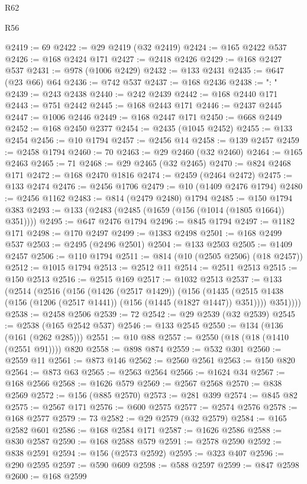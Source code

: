 \begin{lexlean}{R62}
\begin{lexlean}{R56}
\begin{coremodule}
{{{{{{{{{{{{{{{{{{{{{{{{{{{{{{{{{{{{{{{{{{{{{{{{{{{{{{{{{{{{{{{{{{{{{{{{{{{{{{{{{{{{{{{{{{{{{{{{{{{{{{{{{{{{{{{{{{{{{{{{{{{{{{{{{{{{{{{{{{{{{{{{{{{{{{{{{{{{{{{{{{{{{{{{{{{{{{{{{{{{{{{{{{{{{{{{{{{{{{{{{{{{{{{{{{{@2419 := 69
@2422 := @29 @2419 (@32 @2419)
@2424 := @165 @2422 @537
@2426 := @168 @2424 @171
@2427 := @2418 @2426
@2429 := @168 @2427 @537
@2431 := @978 (@1006 @2429)
@2432 := @133 @2431
@2435 := @647 (@23 @66) @64
@2436 := @742 @537
@2437 := @168 @2436
@2438 := ": "
@2439 := @243 @2438
@2440 := @242 @2439
@2442 := @168 @2440 @171
@2443 := @751 @2442
@2445 := @168 @2443 @171
@2446 := @2437 @2445
@2447 := @1006 @2446
@2449 := @168 @2447 @171
@2450 := @668 @2449
@2452 := @168 @2450 @2377
@2454 := @2435 (@1045 @2452)
@2455 := @133 @2454
@2456 := @10 @1794
@2457 := @2456 @14
@2458 := @139 @2457
@2459 := @2458 @1794
@2460 := 70
@2463 := @29 @2460 (@32 @2460)
@2464 := @165 @2463
@2465 := 71
@2468 := @29 @2465 (@32 @2465)
@2470 := @824 @2468 @171
@2472 := @168 @2470 @1816
@2474 := @2459 (@2464 @2472)
@2475 := @133 @2474
@2476 := @2456 @1706
@2479 := @10 (@1409 @2476 @1794)
@2480 := @2456 @1162
@2483 := @814 (@2479 @2480) @1794
@2485 := @150 @1794 @383
@2493 := @133 (@2483 (@2485 (@1659 (@156 (@1014 (@1805 @1664)) @351))))
@2495 := @647 @2476 @1794
@2496 := @845 @1794
@2497 := @1182 @171
@2498 := @170 @2497
@2499 := @1383 @2498
@2501 := @168 @2499 @537
@2503 := @2495 (@2496 @2501)
@2504 := @133 @2503
@2505 := @1409 @2457
@2506 := @110 @1794
@2511 := @814 (@10 (@2505 @2506) (@18 @2457))
@2512 := @1015 @1794
@2513 := @2512 @11
@2514 := @2511 @2513
@2515 := @150 @2513
@2516 := @2515 @169
@2517 := @1032 @2513
@2537 := @133
    (@2514
      (@2516
        (@156
          (@1426 (@2517 @1429))
          (@156
            (@1435 (@2515 @1438 (@156 (@1206 (@2517 @1441)) (@156 (@1445 (@1827 @1447)) @351))))
            @351))))
@2538 := @2458 @2506
@2539 := 72
@2542 := @29 @2539 (@32 @2539)
@2545 := @2538 (@165 @2542 @537)
@2546 := @133 @2545
@2550 := @134 (@136 (@161 (@262 @285)))
@2551 := @10 @88
@2557 := @2550 (@18 (@18 (@1410 (@2551 @91)))) @820
@2558 := @898 @874
@2559 := @532 @301
@2560 := @2559 @11
@2561 := @873 @146
@2562 := @2560 @2561
@2563 := @150 @820
@2564 := @873 @63
@2565 := @2563 @2564
@2566 := @1624 @34
@2567 := @168 @2566
@2568 := @1626 @579
@2569 := @2567 @2568
@2570 := @838 @2569
@2572 := @156 (@885 @2570)
@2573 := @281 @399
@2574 := @845 @82
@2575 := @2567 @171
@2576 := @600 @2575
@2577 := @2574 @2576
@2578 := @168 @2577
@2579 := 73
@2582 := @29 @2579 (@32 @2579)
@2584 := @165 @2582 @601
@2586 := @168 @2584 @171
@2587 := @1626 @2586
@2588 := @830 @2587
@2590 := @168 @2588 @579
@2591 := @2578 @2590
@2592 := @838 @2591
@2594 := @156 (@2573 @2592)
@2595 := @323 @407
@2596 := @290 @2595
@2597 := @590 @609
@2598 := @588 @2597
@2599 := @847 @2598
@2600 := @168 @2599
}}}}}}}}}}}}}}}}}}}}}}}}}}}}}}}}}}}}}}}}}}}}}}}}}}}}}}}}}}}}}}}}}}}}}}}}}}}}}}}}}}}}}}}}}}}}}}}}}}}}}}}}}}}}}}}}}}}}}}}}}}}}}}}}}}}}}}}}}}}}}}}}}}}}}}}}}}}}}}}}}}}}}}}}}}}}}}}}}}}}}}}}}}}}}}}}}}}}}}}}}}}}}}}}}}}
\end{coremodule}
\end{lexlean}
\end{lexlean}
